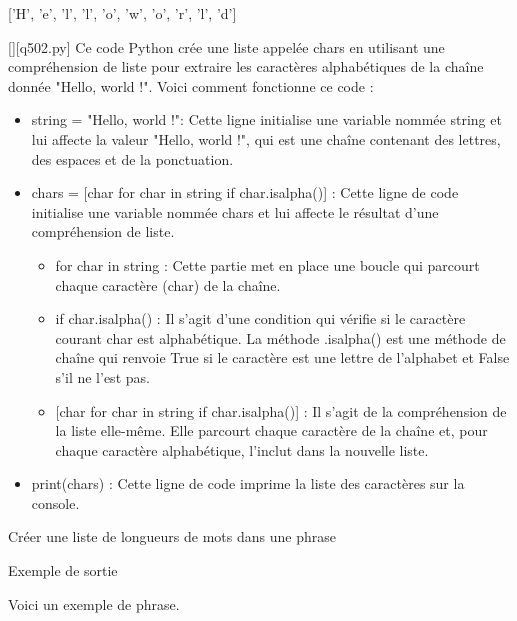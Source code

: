 ['H', 'e', 'l', 'l', 'o', 'w', 'o', 'r', 'l', 'd']
        \par
        \begin{solution}
            \renewcommand{\nomfichier}{q502.py}
            \pythonfile{\chemincode \nomfichier}[][\nomfichier]
            Ce code Python crée une liste appelée chars en utilisant une compréhension de liste pour extraire les caractères alphabétiques de la chaîne donnée "Hello, world !". Voici comment fonctionne ce code :\par

\begin{itemize}
\item     string = "Hello, world !": Cette ligne initialise une variable nommée string et lui affecte la valeur "Hello, world !", qui est une chaîne contenant des lettres, des espaces et de la ponctuation.
\item     chars = [char for char in string if char.isalpha()] : Cette ligne de code initialise une variable nommée chars et lui affecte le résultat d'une compréhension de liste.

\begin{itemize}
\item         for char in string : Cette partie met en place une boucle qui parcourt chaque caractère (char) de la chaîne.
\item         if char.isalpha() : Il s'agit d'une condition qui vérifie si le caractère courant char est alphabétique. La méthode .isalpha() est une méthode de chaîne qui renvoie True si le caractère est une lettre de l'alphabet et False s'il ne l'est pas.
\item{}         [char for char in string if char.isalpha()] : Il s'agit de la compréhension de la liste elle-même. Elle parcourt chaque caractère de la chaîne et, pour chaque caractère alphabétique, l'inclut dans la nouvelle liste.
\end{itemize}
  \item  print(chars) : Cette ligne de code imprime la liste des caractères sur la console.
  \end{itemize}
        \end{solution}
        

        \question
        
        Créer une liste de longueurs de mots dans une phrase

Exemple de sortie

Voici un exemple de phrase.

